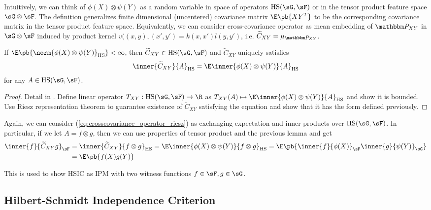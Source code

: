 \documentclass[11pt]{article}
\begin{document}
Intuitively, we can think of $\phi(X)\otimes \psi(Y)$ as a random variable in space of operators $\text{HS}(\sG,\sF)$ or in the tensor product feature space $\sG\otimes \sF$. The definition generalizes finite dimensional (uncentered) covariance matrix $\E\pb{XY^T}$ to be the corresponding covariance matrix in the tensor product feature space. Equivalently, we can consider cross-covariance operator as mean embedding of $\bbP_{XY}$ in $\sG\otimes\sF$ induced by product kernel $v((x,y),(x',y') = k(x,x')l(y,y')$, i.e. $\widetilde{C}_{XY} = \mu_{\bbP_{XY}}$. 

\begin{lemma}
    If $\E\pb{\norm{\phi(X)\otimes \psi(Y)}_{\text{HS}}} < \infty$, then $\widetilde{C}_{XY}\in\text{HS}(\sG,\sF)$ and $\widetilde{C}_{XY}$ uniquely satisfies
    \begin{align}
        \label{eq:crosscovariance_operator_riesz}
        \inner{\widetilde{C}_{XY}}{A}_{\text{HS}} 
            = \E\inner{\phi(X)\otimes \psi(Y)}{A}_{\text{HS}}
    \end{align}
    for any $A \in \text{HS}(\sG,\sF)$.
\end{lemma}

\begin{proof}
    Detail in \cite{grettonNotesMeanEmbeddings2019}. Define linear operator $T_{XY}: \text{HS}(\sG,\sF) \to\R$ as $T_{XY}(A) \mapsto \E\inner{\phi(X)\otimes \psi(Y)}{A}_{\text{HS}}$ and show it is bounded. Use Riesz representation theorem to guarantee existence of $\widetilde{C}_{XY}$ satisfying the equation and show that it has the form defined previously.
\end{proof}

Again, we can consider (\ref{eq:crosscovariance_operator_riesz}) as exchanging expectation and inner products over $\text{HS}(\sG,\sF)$. In particular, if we let $A=f\otimes g$, then we can use properties of tensor product and the previous lemma and get
\begin{align}
    \inner{f}{\widetilde{C}_{XY}g}_{\sF}
        &= \inner{\widetilde{C}_{XY}}{f\otimes g}_{\text{HS}} 
        = \E\inner{\phi(X)\otimes\psi(Y)}{f\otimes g}_{\text{HS}} 
        = \E\pb{ \inner{f}{\phi(X)}_{\sF} \inner{g}{\psi(Y)}_{\sG} } \\
        &= \E\pb{ f(X)g(Y) }
\end{align}

This is used to show HSIC as IPM with two witness functions $f\in\sF,g\in\sG$. 


\subsection{Hilbert-Schmidt Independence Criterion}
\end{document}
